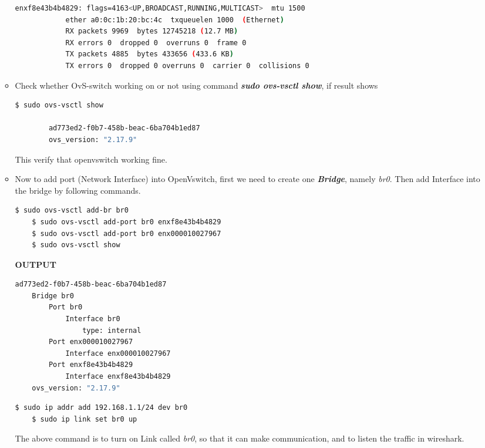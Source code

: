 \documentclass[12pt,letterpaper]{article}
\begin{document}
\begin{enumerate}
\begin{itemize}[label=$\rightarrow$]
\begin{lstlisting}[language=bash]
        enxf8e43b4b4829: flags=4163<UP,BROADCAST,RUNNING,MULTICAST>  mtu 1500
            ether a0:0c:1b:20:bc:4c  txqueuelen 1000  (Ethernet)
            RX packets 9969  bytes 12745218 (12.7 MB)
            RX errors 0  dropped 0  overruns 0  frame 0
            TX packets 4885  bytes 433656 (433.6 KB)
            TX errors 0  dropped 0 overruns 0  carrier 0  collisions 0

\end{lstlisting}

            \item Check whether OvS-switch working on or not using command \textbf{\textit{sudo ovs-vsctl show}}, if result shows 

\begin{lstlisting}[language=bash]
    $ sudo ovs-vsctl show
    
        ad773ed2-f0b7-458b-beac-6ba704b1ed87
        ovs_version: "2.17.9"
\end{lstlisting}

    This verify that openvswitch working fine.

    \item Now to add port (Network Interface) into OpenVswitch, first we need to create one \textbf{\textit{Bridge}}, namely \textit{br0}. Then add Interface into the bridge by following commands.
    
\begin{lstlisting}[language=bash]
    $ sudo ovs-vsctl add-br br0
    $ sudo ovs-vsctl add-port br0 enxf8e43b4b4829
    $ sudo ovs-vsctl add-port br0 enx000010027967
    $ sudo ovs-vsctl show
\end{lstlisting}    

    \textbf{OUTPUT}

\begin{lstlisting}[language=bash]
    ad773ed2-f0b7-458b-beac-6ba704b1ed87
    Bridge br0
        Port br0
            Interface br0
                type: internal
        Port enx000010027967
            Interface enx000010027967
        Port enxf8e43b4b4829
            Interface enxf8e43b4b4829
    ovs_version: "2.17.9"

\end{lstlisting}   

\begin{lstlisting}[language=bash]
    $ sudo ip addr add 192.168.1.1/24 dev br0
    $ sudo ip link set br0 up
\end{lstlisting}

    The above command is to turn on Link called \textit{br0}, so that it can make communication, and to listen the traffic in wireshark. 
    

\end{itemize}
\end{enumerate}
\end{document}
